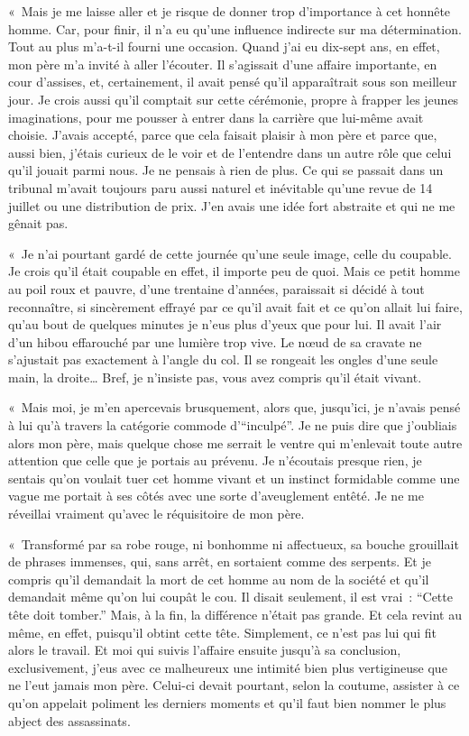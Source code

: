 \documentclass[french,twoside]{book} %
\begin{document}
« Mais je me laisse aller et je risque de donner trop d’importance à cet honnête homme. Car, pour finir, il n’a eu qu’une influence indirecte sur ma détermination. Tout au plus m’a-t-il fourni une occasion. Quand j’ai eu dix-sept ans, en effet, mon père m’a invité à aller l’écouter. Il s’agissait d’une affaire importante, en cour d’assises, et, certainement, il avait pensé qu’il apparaîtrait sous son meilleur jour. Je crois aussi qu’il comptait sur cette cérémonie, propre à frapper les jeunes imaginations, pour me pousser à entrer dans la carrière que lui-même avait choisie. J’avais accepté, parce que cela faisait plaisir à mon père et parce que, aussi bien, j’étais curieux de le voir et de l’entendre dans un autre rôle que celui qu’il jouait parmi nous. Je ne pensais à rien de plus. Ce qui se passait dans un tribunal m’avait toujours paru aussi naturel et inévitable qu’une revue de 14 juillet ou une distribution de prix. J’en avais une idée fort abstraite et qui ne me gênait pas.\par
« Je n’ai pourtant gardé de cette journée qu’une seule image, celle du coupable. Je crois qu’il était coupable en effet, il importe peu de quoi. Mais ce petit homme au poil roux et pauvre, d’une trentaine d’années, paraissait si décidé à tout reconnaître, si sincèrement effrayé par ce qu’il avait fait et ce qu’on allait lui faire, qu’au bout de quelques minutes je n’eus plus d’yeux que pour lui. Il avait l’air d’un hibou effarouché par une lumière trop vive. Le nœud de sa cravate ne s’ajustait pas exactement à l’angle du col. Il se rongeait les ongles d’une seule main, la droite… Bref, je n’insiste pas, vous avez compris qu’il était vivant.\par
« Mais moi, je m’en apercevais brusquement, alors que, jusqu’ici, je n’avais pensé à lui qu’à travers la catégorie commode d’“inculpé”. Je ne puis dire que j’oubliais alors mon père, mais quelque chose me serrait le ventre qui m’enlevait toute autre attention que celle que je portais au prévenu. Je n’écoutais presque rien, je sentais qu’on voulait tuer cet homme vivant et un instinct formidable comme une vague me portait à ses côtés avec une sorte d’aveuglement entêté. Je ne me réveillai vraiment qu’avec le réquisitoire de mon père.\par
« Transformé par sa robe rouge, ni bonhomme ni affectueux, sa bouche grouillait de phrases immenses, qui, sans arrêt, en sortaient comme des serpents. Et je compris qu’il demandait la mort de cet homme au nom de la société et qu’il demandait même qu’on lui coupât le cou. Il disait seulement, il est vrai : “Cette tête doit tomber.” Mais, à la fin, la différence n’était pas grande. Et cela revint au même, en effet, puisqu’il obtint cette tête. Simplement, ce n’est pas lui qui fit alors le travail. Et moi qui suivis l’affaire ensuite jusqu’à sa conclusion, exclusivement, j’eus avec ce malheureux une intimité bien plus vertigineuse que ne l’eut jamais mon père. Celui-ci devait pourtant, selon la coutume, assister à ce qu’on appelait poliment les derniers moments et qu’il faut bien nommer le plus abject des assassinats.\par
\end{document}
